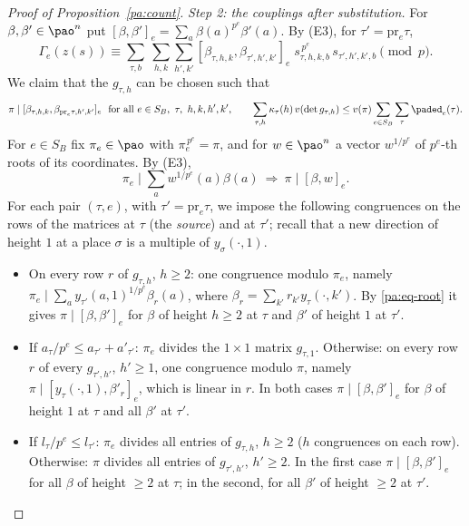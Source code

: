 \documentclass[10pt]{amsart}
\theoremstyle{definition}
\theoremstyle{remark}
\begin{document}
\begin{proof}[Proof of Proposition~\ref{pa:count}]
\emph{Step 2: the couplings after substitution.} For $\beta,\beta'\in\pao^n$ put
$[\beta,\beta']_e=\sum_a\beta(a)^{p^e}\beta'(a)$. By (E3), for $\tau'=\mathrm{pr}_e\tau$,
\[
\Gamma_e(z(s))\equiv\sum_{\tau,b}\ \sum_{h,k}\sum_{h',k'}[\beta_{\tau,h,k},\beta_{\tau',h',k'}]_e\;
s_{\tau,h,k,b}^{\,p^e}\,s_{\tau',h',k',b}\pmod p .
\]
We claim that the $g_{\tau,h}$ can be chosen such that
\begin{equation}\label{pa:eq-goal}
\pi\mid[\beta_{\tau,h,k},\beta_{\mathrm{pr}_e\tau,h',k'}]_e\ \ \text{for all }e\in S_B,\ \tau,\
h,k,h',k',\qquad
\sum_{\tau,h}\kappa_\tau(h)\,v(\det g_{\tau,h})\le v(\pi)\sum_{e\in S_B}\sum_\tau\paded_e(\tau).
\end{equation}
For $e\in S_B$ fix $\pi_e\in\pao$ with $\pi_e^{\,p^e}=\pi$, and for $w\in\pao^n$ a vector
$w^{1/p^e}$ of $p^e$-th roots of its coordinates. By (E3),
\begin{equation}\label{pa:eq-root}
\pi_e\mid\textstyle\sum_aw^{1/p^e}(a)\beta(a)\ \Longrightarrow\ \pi\mid[\beta,w]_e .
\end{equation}
For each pair $(\tau,e)$, with $\tau'=\mathrm{pr}_e\tau$, we impose the following congruences on
the rows of the matrices at $\tau$ (the \emph{source}) and at $\tau'$; recall that a new direction
of height $1$ at a place $\sigma$ is a multiple of $y_\sigma(\cdot,1)$.
\begin{itemize}
\item[(a)] On every row $r$ of $g_{\tau,h}$, $h\ge2$: one congruence modulo $\pi_e$, namely
$\pi_e\mid\sum_a y_{\tau'}(a,1)^{1/p^e}\beta_r(a)$, where $\beta_r=\sum_{k'}r_{k'}y_\tau(\cdot,k')$.
By \eqref{pa:eq-root} it gives $\pi\mid[\beta,\beta']_e$ for $\beta$ of height $h\ge2$ at $\tau$
and $\beta'$ of height $1$ at $\tau'$.
\item[(b)] If $a_\tau/p^e\le a_{\tau'}+a'_{\tau'}$: $\pi_e$ divides the $1\times1$ matrix
$g_{\tau,1}$. Otherwise: on every row $r$ of every $g_{\tau',h'}$, $h'\ge1$, one congruence modulo
$\pi$, namely $\pi\mid[y_\tau(\cdot,1),\beta'_r]_e$, which is linear in $r$. In both cases
$\pi\mid[\beta,\beta']_e$ for $\beta$ of height $1$ at $\tau$ and all $\beta'$ at $\tau'$.
\item[(c)] If $l_\tau/p^e\le l_{\tau'}$: $\pi_e$ divides all entries of $g_{\tau,h}$, $h\ge2$
($h$ congruences on each row). Otherwise: $\pi$ divides all entries of $g_{\tau',h'}$, $h'\ge2$. In
the first case $\pi\mid[\beta,\beta']_e$ for all $\beta$ of height $\ge2$ at $\tau$; in the second,
for all $\beta'$ of height $\ge2$ at $\tau'$.
\end{itemize}

\end{proof}
\end{document}
